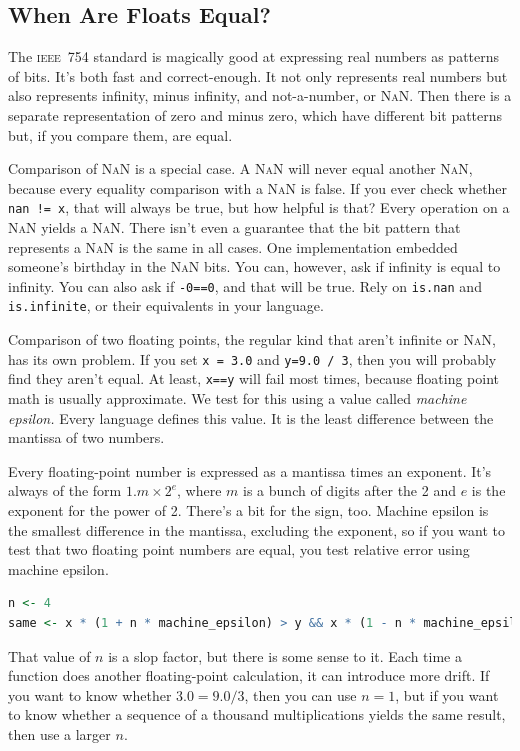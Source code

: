\documentclass[fleqn,10pt]{olplainarticle}
\newcommand{\nan}{\textsc{NaN}\xspace}
\newcommand{\ieee}{\textsc{ieee}\xspace}
\begin{document}
\subsection{When Are Floats Equal?}
The \ieee~754 standard is magically good at expressing real numbers as
patterns of bits. It's both fast and correct-enough. It not only represents
real numbers but also represents infinity, minus infinity, and
not-a-number, or \nan. Then there is a separate representation of
zero and minus zero, which have different bit patterns but, if you compare
them, are equal.

Comparison of \nan is a special case.
A \nan will never equal another \nan, because every equality comparison with
a \nan is false. If you ever check whether \lstinline|nan != x|, that will
always be true, but how helpful is that?
Every operation
on a \nan yields a \nan. There isn't even a guarantee that the bit
pattern that represents a \nan is the same in all cases.
One implementation embedded someone's birthday in the \nan bits.
You can, however, ask if infinity
is equal to infinity. You can also ask if
\lstinline!-0==0!, and that will be true. Rely on \lstinline!is.nan! and
\lstinline!is.infinite!, or their equivalents in your language.

Comparison of two floating points, the regular kind that aren't
infinite or \nan, has its own problem. If you set
\lstinline!x = 3.0! and \lstinline!y=9.0 / 3!, then you will probably find they
aren't equal. At least, \lstinline!x==y! will fail most times, because
floating point math is usually approximate. We test for this
using a value called \emph{machine epsilon.} Every language defines
this value. It is the least difference between the
mantissa of two numbers.

Every floating-point number is expressed as a mantissa times
an exponent. It's always of the form $1.m \times 2^e$, where
$m$ is a bunch of digits after the 2 and $e$ is the exponent
for the power of 2. There's a bit for the sign, too.
Machine epsilon is the smallest difference in the mantissa,
excluding the exponent, so if you want to test that two
floating point numbers are equal, you test relative error using
machine epsilon.
\begin{lstlisting}[language=R]
n <- 4
same <- x * (1 + n * machine_epsilon) > y && x * (1 - n * machine_epsilon) < y
\end{lstlisting}
That value of $n$ is a slop factor, but there is some sense
to it. Each time a function does another floating-point calculation,
it can introduce more drift. If you want to know whether
$3.0 = 9.0 / 3$, then you can use $n=1$, but if you want to know
whether a sequence of a thousand multiplications yields the
same result, then use a larger $n$.
\end{document}

